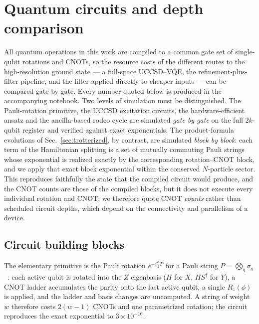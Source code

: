 \documentclass[
  aps,            %
  prc,            %
  reprint,        %
  superscriptaddress,
  floatfix,
  nofootinbib
]{revtex4-2}
\begin{document}
\section{Quantum circuits and depth comparison}
\label{sec:circuits}
All quantum operations in this work are compiled to a common gate set of
single-qubit rotations and CNOTs, so the resource costs of the different routes
to the high-resolution ground state --- a full-space UCCSD--VQE, the
refinement-plus-filter pipeline, and the filter applied directly to cheaper
inputs --- can be compared gate by gate.  Every number quoted below is produced
in the accompanying notebook.  Two levels of simulation must be distinguished.
The Pauli-rotation primitive, the UCCSD excitation circuits, the
hardware-efficient ansatz and the ancilla-based rodeo cycle are simulated
\emph{gate by gate} on the full $2k$-qubit register and verified against exact
exponentials.  The product-formula evolutions of Sec.~\ref{sec:trotterized},
by contrast, are simulated \emph{block by block}: each term of the Hamiltonian
splitting is a set of mutually commuting Pauli strings whose exponential is
realized exactly by the corresponding rotation--CNOT block, and we apply that
exact block exponential within the conserved $N$-particle sector.  This
reproduces faithfully the state that the compiled circuit would produce, and
the CNOT counts are those of the compiled blocks, but it does not execute
every individual rotation and CNOT; we therefore quote CNOT \emph{counts}
rather than scheduled circuit depths, which depend on the connectivity and
parallelism of a device.

\subsection{Circuit building blocks}
\label{sec:blocks}
The elementary primitive is the Pauli rotation $e^{-i\frac{\phi}{2}P}$ for a
Pauli string $P=\bigotimes_q\sigma_q$~\cite{NielsenChuang}: each active qubit is rotated into the $Z$
eigenbasis ($H$ for $X$, $HS^\dagger$ for $Y$), a CNOT ladder accumulates the
parity onto the last active qubit, a single $R_z(\phi)$ is applied, and the
ladder and basis changes are uncomputed.  A string of weight $w$ therefore costs
$2(w-1)$ CNOTs and one parametrized rotation; the circuit reproduces the exact
exponential to $3\times10^{-16}$.
\end{document}
